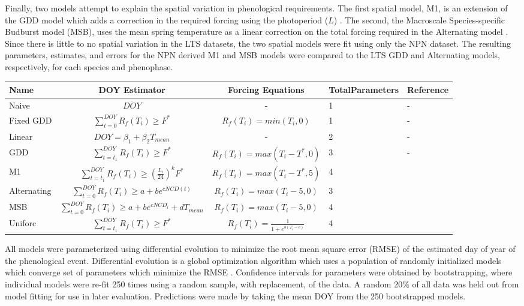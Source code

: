 \documentclass[fleqn,10pt,lineno]{wlpeerj} %
\begin{document}
Finally, two models attempt to explain the spatial variation in phenological requirements. The first spatial model, M1, is an extension of the GDD model which adds a correction in the required forcing using the photoperiod ($L$) \citep{blumel2012}. The second, the Macroscale Species-specific Budburst model (MSB), uses the mean spring temperature as a linear correction on the total forcing required in the Alternating model \citep{jeong2013}. Since there is little to no spatial variation in the LTS datasets, the two spatial models were fit using only the NPN dataset. The resulting parameters, estimates, and errors for the NPN derived M1 and MSB models were compared to the LTS GDD and Alternating models, respectively, for each species and phenophase.  

\begin{center}
{\def\arraystretch{2}\tabcolsep=5pt
    \begin{tabular}{ | l | c | c | p{1.3cm} | l |}
    \hline
    Name & DOY Estimator & Forcing Equations & Total\newline Parameters & Reference \\ \hline
    Naive & \( \overline{DOY} \) & - & 1 & - \\
    Fixed GDD &$\sum_{t=0}^{DOY}R_{f}(T_{i})\geq F^{*} $  & $R_{f}(T_{i}) = min(T_{i}, 0)$ & 1 & - \\
    Linear & \( DOY = \beta_{1} + \beta_{2}T_{mean} \) & - & 2 & - \\
    GDD & $\sum_{t=t_{1}}^{DOY}R_{f}(T_{i})\geq F^{*} $ & $ R_{f}(T_{i}) = max(T_{i} - T^{*}, 0) $  & 3 & - \\
    M1 & $\sum_{t=t_{1}}^{DOY}R_{f}(T_{i})\geq (\frac{L_{i}}{24})^{k} F^{*} $ & $ R_{f}(T_{i}) = max(T_{i}-T^{*}, 5) $  & 4 & \citep{blumel2012} \\
    Alternating & $\sum_{t=0}^{DOY}R_{f}(T_{i})\geq a + be^{cNCD(t)} $ & $R_{f}(T_{i}) = max(T_{i}-5, 0) $ & 3 & \citep{cannell1983} \\
    MSB & $\sum_{t=0}^{DOY}R_{f}(T_{i})\geq a + be^{cNCD_{i}} +dT_{mean} $ & $R_{f}(T_{i}) = max(T_{i}-5, 0) $ & 4 & \citep{jeong2013} \\
    Uniforc &  $\sum_{t=t_{1}}^{DOY}R_{f}(T_{i})\geq F^{*} $ & $ R_{f}(T_{i}) = \frac{1}{1 + e^{b(T_{i}-c)}} $ & 4 & \citep{chuine2000} \\

    \hline
    \end{tabular}
    }
\end{center}

All models were parameterized using differential evolution to minimize the root mean square error (RMSE) of the estimated day of year of the phenological event. Differential evolution is a global optimization algorithm which uses a population of randomly initialized models which converge set of parameters which minimize the RMSE \citep{storn1997}. Confidence intervals for parameters were obtained by bootstrapping, where individual models were re-fit 250 times using a random sample, with replacement, of the data. A random 20\% of all data was held out from model fitting for use in later evaluation. Predictions were made by taking the mean DOY from the 250 bootstrapped models. 
\end{document}
